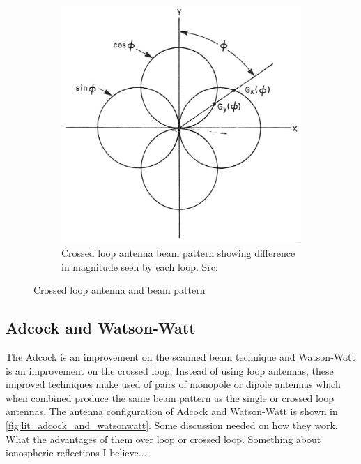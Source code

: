 \begin{figure}
\begin{subfigure}[b]{0.4\textwidth}
    \includegraphics[width=\textwidth]{./img/lit_review/loop_antenna_crossed_beam}
    \caption{Crossed loop antenna beam pattern showing difference in magnitude seen by each loop. Src: \cite{jenkins1991smallaperture}}
  \end{subfigure}
  \caption{Crossed loop antenna and beam pattern}
  \label{fig:lit_crossed_loop_antenna}
\end{figure}

\subsection{Adcock and Watson-Watt}
The Adcock is an improvement on the scanned beam technique and Watson-Watt is an improvement on the crossed loop. Instead of using loop antennas, these improved techniques make used of pairs of monopole or dipole antennas which when combined produce the same beam pattern as the single or crossed loop antennas. The antenna configuration of Adcock and Watson-Watt is shown in \autoref{fig:lit_adcock_and_watsonwatt}.
Some discussion needed on how they work. What the advantages of them over loop or crossed loop. Something about ionospheric reflections I believe...

